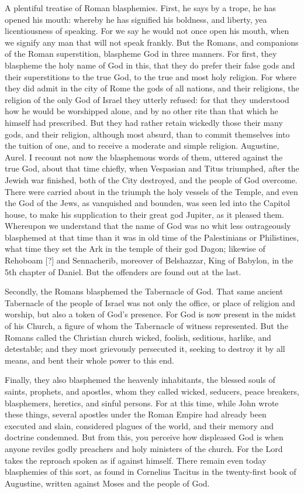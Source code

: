 A plentiful treatise of Roman blasphemies. First, he says by a trope, he has opened his mouth: whereby he has signified his boldness, and liberty, yea licentiousness of speaking. For we say he would not once open his mouth, when we signify any man that will not speak frankly. But the Romans, and companions of the Roman superstition, blaspheme God in three manners. For first, they blaspheme the holy name of God in this, that they do prefer their false gods and their superstitions to the true God, to the true and most holy religion. For where they did admit in the city of Rome the gods of all nations, and their religions, the religion of the only God of Israel they utterly refused: for that they understood how he would be worshipped alone, and by no other rite than that which he himself had prescribed. But they had rather retain wickedly those their many gods, and their religion, although most absurd, than to commit themselves into the tuition of one, and to receive a moderate and simple religion. Augustine, Aurel. I recount not now the blasphemous words of them, uttered against the true God, about that time chiefly, when Vespasian and Titus triumphed, after the Jewish war finished, both of the City destroyed, and the people of God overcome. There were carried about in the triumph the holy vessels of the Temple, and even the God of the Jews, as vanquished and bounden, was seen led into the Capitol house, to make his supplication to their great god Jupiter, as it pleased them. Whereupon we understand that the name of God was no whit less outrageously blasphemed at that time than it was in old time of the Palestinians or Philistines, what time they set the Ark in the temple of their god Dagon; likewise of Rehoboam [?] and Sennacherib, moreover of Belshazzar, King of Babylon, in the 5th chapter of Daniel. But the offenders are found out at the last.

Secondly, the Romans blasphemed the Tabernacle of God. That same ancient Tabernacle of the people of Israel was not only the office, or place of religion and worship, but also a token of God’s presence. For God is now present in the midst of his Church, a figure of whom the Tabernacle of witness represented. But the Romans called the Christian church wicked, foolish, seditious, harlike, and detestable; and they most grievously persecuted it, seeking to destroy it by all means, and bent their whole power to this end.

Finally, they also blasphemed the heavenly inhabitants, the blessed souls of saints, prophets, and apostles, whom they called wicked, seducers, peace breakers, blasphemers, heretics, and sinful persons. For at this time, while John wrote these things, several apostles under the Roman Empire had already been executed and slain, considered plagues of the world, and their memory and doctrine condemned. But from this, you perceive how displeased God is when anyone reviles godly preachers and holy ministers of the church. For the Lord takes the reproach spoken as if against himself. There remain even today blasphemies of this sort, as found in Cornelius Tacitus in the twenty-first book of Augustine, written against Moses and the people of God.

